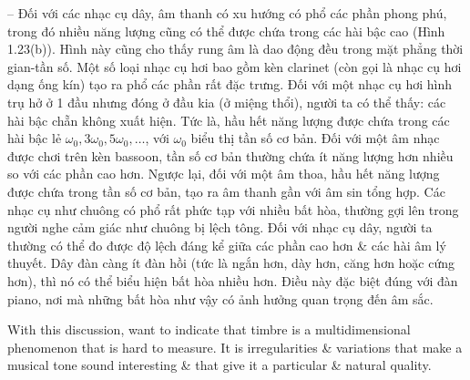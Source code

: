 \documentclass{article}
\begin{document}
\begin{itemize}
\begin{itemize}
\begin{itemize}
			-- Đối với các nhạc cụ dây, âm thanh có xu hướng có phổ các phần phong phú, trong đó nhiều năng lượng cũng có thể được chứa trong các hài bậc cao ({\sf Hình 1.23(b)}). Hình này cũng cho thấy rung âm là dao động đều trong mặt phẳng thời gian-tần số. Một số loại nhạc cụ hơi bao gồm kèn clarinet (còn gọi là nhạc cụ hơi dạng ống kín) tạo ra phổ các phần rất đặc trưng. Đối với một nhạc cụ hơi hình trụ hở ở 1 đầu nhưng đóng ở đầu kia (ở miệng thổi), người ta có thể thấy: các hài bậc chẵn không xuất hiện. Tức là, hầu hết năng lượng được chứa trong các hài bậc lẻ $\omega_0,3\omega_0,5\omega_0,\ldots$, với $\omega_0$ biểu thị tần số cơ bản. Đối với một âm nhạc được chơi trên kèn bassoon, tần số cơ bản thường chứa ít năng lượng hơn nhiều so với các phần cao hơn. Ngược lại, đối với một âm thoa, hầu hết năng lượng được chứa trong tần số cơ bản, tạo ra âm thanh gần với âm sin tổng hợp. Các nhạc cụ như chuông có phổ rất phức tạp với nhiều bất hòa, thường gợi lên trong người nghe cảm giác như chuông bị lệch tông. Đối với nhạc cụ dây, người ta thường có thể đo được độ lệch đáng kể giữa các phần cao hơn \& các hài âm lý thuyết. Dây đàn càng ít đàn hồi (tức là ngắn hơn, dày hơn, căng hơn hoặc cứng hơn), thì nó có thể biểu hiện bất hòa nhiều hơn. Điều này đặc biệt đúng với đàn piano, nơi mà những bất hòa như vậy có ảnh hưởng quan trọng đến âm sắc.
			
			With this discussion, want to indicate that timbre is a multidimensional phenomenon that is hard to measure. It is irregularities \& variations that make a musical tone sound interesting \& that give it a particular \& natural quality.
			

\end{itemize}
\end{itemize}
\end{itemize}
\end{document}
